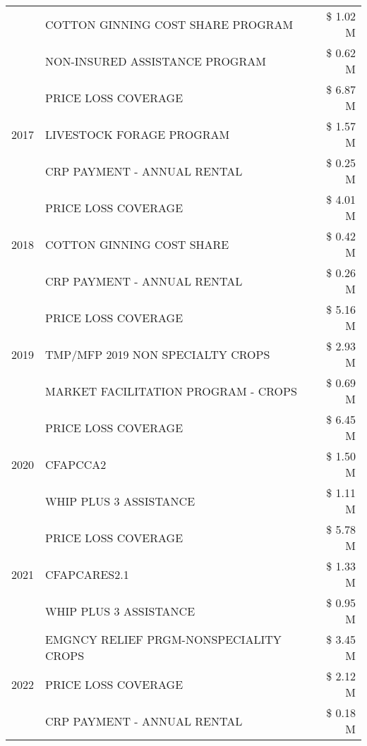 \begin{tabular}{llr}
 & COTTON GINNING COST SHARE PROGRAM & \$ 1.02 M \\
 & NON-INSURED ASSISTANCE PROGRAM & \$ 0.62 M \\
\cline{1-3}
\multirow[t]{3}{*}{2017} & PRICE LOSS COVERAGE & \$ 6.87 M \\
 & LIVESTOCK FORAGE PROGRAM & \$ 1.57 M \\
 & CRP PAYMENT - ANNUAL RENTAL & \$ 0.25 M \\
\cline{1-3}
\multirow[t]{3}{*}{2018} & PRICE LOSS COVERAGE & \$ 4.01 M \\
 & COTTON GINNING COST SHARE & \$ 0.42 M \\
 & CRP PAYMENT - ANNUAL RENTAL & \$ 0.26 M \\
\cline{1-3}
\multirow[t]{3}{*}{2019} & PRICE LOSS COVERAGE & \$ 5.16 M \\
 & TMP/MFP 2019 NON SPECIALTY CROPS & \$ 2.93 M \\
 & MARKET FACILITATION PROGRAM - CROPS & \$ 0.69 M \\
\cline{1-3}
\multirow[t]{3}{*}{2020} & PRICE LOSS COVERAGE & \$ 6.45 M \\
 & CFAPCCA2 & \$ 1.50 M \\
 & WHIP PLUS 3 ASSISTANCE & \$ 1.11 M \\
\cline{1-3}
\multirow[t]{3}{*}{2021} & PRICE LOSS COVERAGE & \$ 5.78 M \\
 & CFAPCARES2.1 & \$ 1.33 M \\
 & WHIP PLUS 3 ASSISTANCE & \$ 0.95 M \\
\cline{1-3}
\multirow[t]{3}{*}{2022} & EMGNCY RELIEF PRGM-NONSPECIALITY CROPS & \$ 3.45 M \\
 & PRICE LOSS COVERAGE & \$ 2.12 M \\
 & CRP PAYMENT - ANNUAL RENTAL & \$ 0.18 M \\
\cline{1-3}
\bottomrule
\end{tabular}

